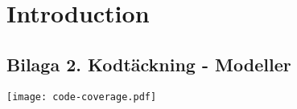\chapter{Introduction}

\section{Bilaga 2. Kodtäckning - Modeller}

\texttt{[image: code-coverage.pdf]}